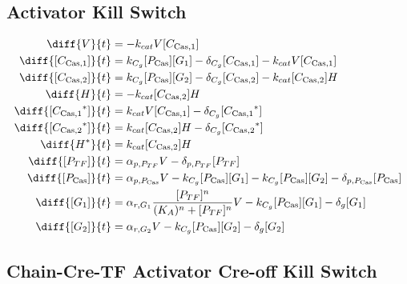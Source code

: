 \subsection{Activator Kill Switch}
\label{s:Activator_Kill_Switch}

\begin{align}
\diff{\vectorGen{}}{t} & = - \casCutRate{{}}\vectorGen{}\conc{\cplx{\cas}{1}}\\
\diff{\conc{\cplx{\cas}{1}}}{t} & =  \gRnaBind{}\conc{\proSp{\cas{}}}\conc{\gRna{1}} - \casCompDegradeRate{}\conc{\cplx{\cas}{1}} - \casCutRate{{}}\vectorGen{}\conc{\cplx{\cas}{1}}\\
\diff{\conc{\cplx{\cas}{2}}}{t} & =  \gRnaBind{}\conc{\proSp{\cas{}}}\conc{\gRna{2}} - \casCompDegradeRate{}\conc{\cplx{\cas}{2}} - \casCutRate{{}}\conc{\cplx{\cas}{2}}\hostGen{}\\
\diff{\hostGen{}}{t} & = - \casCutRate{{}}\conc{\cplx{\cas}{2}}\hostGen{}\\
\diff{\conc{\bound{\cplx{\cas}{1}}}}{t} & =  \casCutRate{{}}\vectorGen{}\conc{\cplx{\cas}{1}} - \casCompDegradeRate{}\conc{\bound{\cplx{\cas}{1}}}\\
\diff{\conc{\bound{\cplx{\cas}{2}}}}{t} & =  \casCutRate{{}}\conc{\cplx{\cas}{2}}\hostGen{} - \casCompDegradeRate{}\conc{\bound{\cplx{\cas}{2}}}\\
\diff{\edited{\hostGen{}}}{t} & =  \casCutRate{{}}\conc{\cplx{\cas}{2}}\hostGen{}\\
\diff{\conc{\proSp{TF}}}{t} & =  \txtlRate{\proSp{TF}}\vectorGen{} - \proDegradeRate{\proSp{TF}}\conc{\proSp{TF}}\\
\diff{\conc{\proSp{\cas{}}}}{t} & =  \txtlRate{\proSp{\cas{}}}\vectorGen{} - \gRnaBind{}\conc{\proSp{\cas{}}}\conc{\gRna{1}} - \gRnaBind{}\conc{\proSp{\cas{}}}\conc{\gRna{2}} - \proDegradeRate{\proSp{\cas{}}}\conc{\proSp{\cas{}}}\\
\diff{\conc{\gRna{1}}}{t} & =  \txRate{\gRna{1}}\frac{\conc{\proSp{TF}}^n}{(K_A)^n + \conc{\proSp{TF}}^n}\vectorGen{} - \gRnaBind{}\conc{\proSp{\cas{}}}\conc{\gRna{1}} - \rnaDegradeRate{}\conc{\gRna{1}}\\
\diff{\conc{\gRna{2}}}{t} & =  \txRate{\gRna{2}}\vectorGen{} - \gRnaBind{}\conc{\proSp{\cas{}}}\conc{\gRna{2}} - \rnaDegradeRate{}\conc{\gRna{2}}
\end{align}

\subsection{Chain-Cre-TF Activator Cre-off Kill Switch}
\label{s:Chain_Cre_TF_Activator_Cre_off_Kill_Switch}

